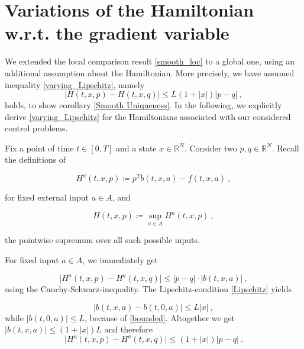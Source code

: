 \section{Variations of the Hamiltonian w.r.t. the gradient variable}
\label{Hamiltonian gradient}

We extended the local comparison result \ref{smooth_loc} to a global one, using an additional assumption about the Hamiltonian. More precisely, we have assumed inequality \eqref{varying_Lipschitz}, namely
\begin{equation*}
	\lvert H(t, x, p) - H(t, x, q) \rvert \leq L \left(1 + \lvert x \rvert \right) \lvert p - q \rvert \ ,
\end{equation*}
holds, to show corollary \ref{Smooth Uniqueness}. In the following, we explicitly derive \eqref{varying_Lipschitz} for the Hamiltonians associated with our considered control problems. 

Fix a point of time $ t \in [0, T] $ and a state $ x \in \mathbb{R}^N $. Consider two  $ p, q \in \mathbb{R}^N $. Recall the definitions of

\begin{equation*}
	H^{a}(t, x, p) \coloneqq p^{T} b(t, x, a) - f(t, x, a) \ ,
\end{equation*} 

for fixed external input $ a \in A $, and 

\begin{equation*}
	H(t, x, p) \coloneqq \sup\limits_{a \in A} H^{a}(t, x, p) \ ,
\end{equation*}

the pointwise supremum over all such possible inputs.

For fixed input $ a \in A $, we immediately get

\begin{equation*}
	\lvert H^{a}(t, x, p) - H^{a}(t, x, q) \lvert \leq \lvert p - q \rvert \cdot \lvert b(t, x, a) \rvert \ ,
\end{equation*}
using the Cauchy-Schwarz-inequality. The Lipschitz-condition \eqref{Lipschitz} yields

\begin{equation*}
	\lvert b(t, x, a) - b(t, 0, a) \rvert \leq L \lvert x \rvert \ ,
\end{equation*}
while $ \lvert b(t, 0, a)  \rvert \leq L $, because of \eqref{bounded}. Altogether we get $ \lvert b(t, x, a) \rvert \leq (1 + \lvert x \rvert) L $ and therefore
\begin{equation}
	\label{index ineq}
	\lvert H^{a}(t, x, p) - H^{a}(t, x, q) \lvert \leq (1 + \lvert x \rvert) \lvert p - q \rvert \ .
\end{equation}

